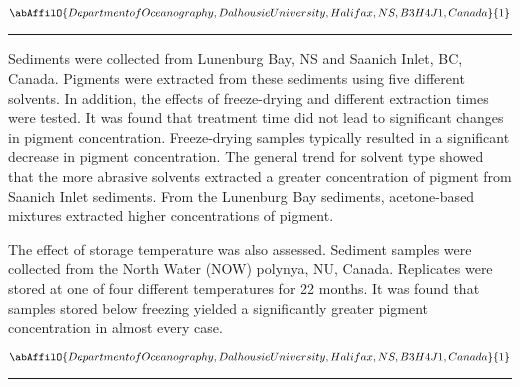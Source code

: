\begin{center}
   \vspace{2 mm} \begin{center}
    \vspace{2 mm}\begin{center}
  
  $\abAffilO{Department of Oceanography, Dalhousie University, Halifax, NS, B3H 4J1, Canada}{1}$

  \end{center}
  \vspace{2 mm}
  \end{center}\end{center}
  \begin{center}\rule{0.70\linewidth}{0.5 pt}\end{center}

\noindent Sediments were collected from Lunenburg Bay, NS and Saanich Inlet, BC, Canada. Pigments were extracted from these sediments using five different solvents. In addition, the effects of freeze-drying and different extraction times were tested. It was found that treatment time did not lead to significant changes in pigment concentration. Freeze-drying samples typically resulted in a significant decrease in pigment concentration. The general trend for solvent type showed that the more abrasive solvents extracted a greater concentration of pigment from Saanich Inlet sediments. From the Lunenburg Bay sediments, acetone-based mixtures extracted higher concentrations of pigment.

The effect of storage temperature was also assessed. Sediment samples were collected from the North Water (NOW) polynya, NU, Canada. Replicates were stored at one of four different temperatures for 22 months. It was found that samples stored below freezing yielded a significantly greater pigment concentration in almost every case.

\begin{center}
   \vspace{2 mm} \begin{center}
    \vspace{2 mm}\begin{center}
  
  $\abAffilO{Department of Oceanography, Dalhousie University, Halifax, NS, B3H 4J1, Canada}{1}$

  \end{center}
  \vspace{2 mm}
  \end{center}\end{center}
  \begin{center}\rule{0.70\linewidth}{0.5 pt}\end{center}


